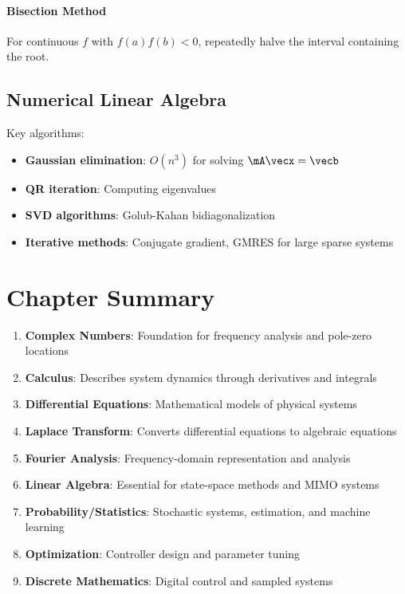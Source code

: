 \subsubsection{Bisection Method}
For continuous $f$ with $f(a)f(b) < 0$, repeatedly halve the interval containing the root.

\section{Numerical Linear Algebra}

Key algorithms:
\begin{itemize}
    \item \textbf{Gaussian elimination}: $O(n^3)$ for solving $\mA\vecx = \vecb$
    \item \textbf{QR iteration}: Computing eigenvalues
    \item \textbf{SVD algorithms}: Golub-Kahan bidiagonalization
    \item \textbf{Iterative methods}: Conjugate gradient, GMRES for large sparse systems
\end{itemize}

\chapter{Chapter Summary}
\label{ch:math_summary}

\begin{keyconceptbox}[title=Key Mathematical Concepts for Control Systems]
\begin{enumerate}
    \item \textbf{Complex Numbers}: Foundation for frequency analysis and pole-zero locations
    \item \textbf{Calculus}: Describes system dynamics through derivatives and integrals
    \item \textbf{Differential Equations}: Mathematical models of physical systems
    \item \textbf{Laplace Transform}: Converts differential equations to algebraic equations
    \item \textbf{Fourier Analysis}: Frequency-domain representation and analysis
    \item \textbf{Linear Algebra}: Essential for state-space methods and MIMO systems
    \item \textbf{Probability/Statistics}: Stochastic systems, estimation, and machine learning
    \item \textbf{Optimization}: Controller design and parameter tuning
    \item \textbf{Discrete Mathematics}: Digital control and sampled systems
\end{enumerate}
\end{keyconceptbox}


